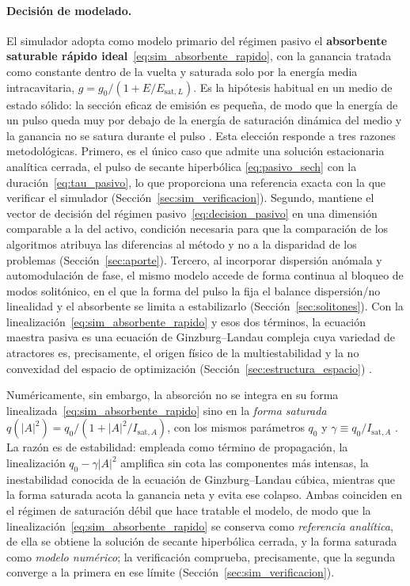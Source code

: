 \paragraph{Decisión de modelado.}
El simulador adopta como modelo primario del régimen pasivo el
\textbf{absorbente saturable rápido ideal}~\eqref{eq:sim_absorbente_rapido}, con la
ganancia tratada como constante dentro de la vuelta y saturada solo por la energía
media intracavitaria, $g=g_0/(1+E/E_{\mathrm{sat},L})$. Es la hipótesis habitual en un
medio de estado sólido: la sección eficaz de emisión es pequeña, de modo que la energía
de un pulso queda muy por debajo de la energía de saturación dinámica del medio y la
ganancia no se satura durante el pulso \cite{Keller2022,Kaertner2020}.
 Esta elección responde a
tres razones metodológicas. Primero, es el único caso que admite una solución
estacionaria analítica cerrada, el pulso de secante hiperbólica
\eqref{eq:pasivo_sech} con la duración~\eqref{eq:tau_pasivo}, lo que proporciona
una referencia exacta con la que verificar el simulador
(Sección~\ref{sec:sim_verificacion}). Segundo, mantiene el vector de decisión del
régimen pasivo~\eqref{eq:decision_pasivo} en una dimensión
comparable a la del activo, condición necesaria para que la comparación de los
algoritmos atribuya las diferencias al método y no a la disparidad de los problemas
(Sección~\ref{sec:aporte}). Tercero, al incorporar dispersión anómala y
automodulación de fase, el mismo modelo accede de forma continua al bloqueo de modos
solitónico, en el que la forma del pulso la fija el balance
dispersión\-/no linealidad y el absorbente se limita a estabilizarlo
(Sección~\ref{sec:solitones}). Con la linealización~\eqref{eq:sim_absorbente_rapido}
y esos dos términos, la ecuación maestra pasiva es una ecuación de
Ginzburg--Landau compleja cuya variedad de atractores es, precisamente, el origen
físico de la multiestabilidad y la no convexidad del espacio de optimización
(Sección~\ref{sec:estructura_espacio}) \cite{Kaertner2020}.

Numéricamente, sin embargo, la absorción no se integra en su forma
linealizada~\eqref{eq:sim_absorbente_rapido} sino en la \emph{forma saturada}
$q(|A|^2)=q_0/\!\left(1+|A|^2/I_{\mathrm{sat},A}\right)$, con los mismos parámetros
$q_0$ y $\gamma\equiv q_0/I_{\mathrm{sat},A}$ \cite{Keller2022}. La razón es de
estabilidad: empleada como término de propagación, la linealización $q_0-\gamma|A|^2$
amplifica sin cota las componentes más intensas, la inestabilidad conocida de la
ecuación de Ginzburg--Landau cúbica, mientras que la forma saturada acota la
ganancia neta y evita ese colapso. Ambas coinciden en el régimen de saturación débil
que hace tratable el modelo, de modo que la
linealización~\eqref{eq:sim_absorbente_rapido} se conserva como \emph{referencia
analítica}, de ella se obtiene la solución de secante hiperbólica cerrada, y la forma
saturada como \emph{modelo numérico}; la verificación comprueba, precisamente, que la
segunda converge a la primera en ese límite (Sección~\ref{sec:sim_verificacion}).

